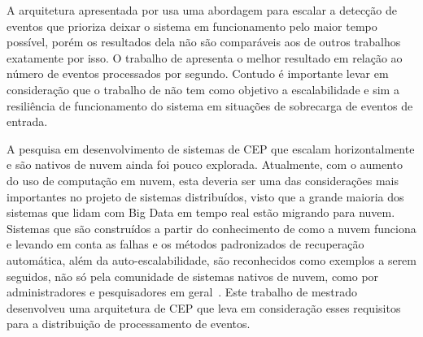 A arquitetura apresentada por \cite{6906776} usa uma abordagem para escalar a detecção de eventos que prioriza deixar o sistema em funcionamento pelo maior tempo possível, porém os resultados dela não são comparáveis aos de outros trabalhos exatamente por isso. O trabalho de \cite{Isoyama:2012:SCE:2335484.2335498} apresenta o melhor resultado em relação ao número de eventos processados por segundo. Contudo é importante levar em consideração que o trabalho de \cite{6906776} não tem como objetivo a escalabilidade e sim a resiliência de funcionamento do sistema em situações de sobrecarga de eventos de entrada.




A pesquisa em desenvolvimento de sistemas de CEP que escalam horizontalmente e são nativos de nuvem ainda foi pouco explorada.
Atualmente, com o aumento do uso de computação em nuvem, esta deveria ser uma das considerações mais importantes no projeto de sistemas distribuídos, visto que a grande maioria dos sistemas que lidam com Big Data em tempo real estão migrando para nuvem. Sistemas que são construídos a partir do conhecimento de como a nuvem funciona e levando em conta as falhas e os métodos padronizados de recuperação automática, além da auto-escalabilidade, são reconhecidos como exemplos a serem seguidos, não só pela comunidade de sistemas nativos de nuvem, como por administradores e pesquisadores em geral~\citep{garrison2017cloud,43826,hightower2017kubernetes,burns2018managing,fowler2017microservices}.
Este trabalho de mestrado desenvolveu uma arquitetura de CEP que leva em consideração esses requisitos para a distribuição de processamento de eventos.




